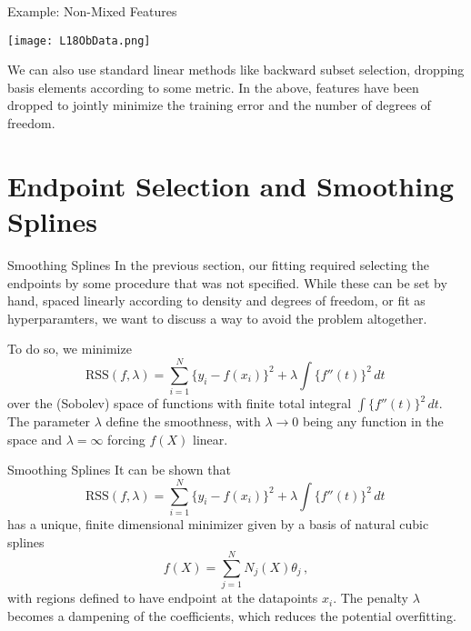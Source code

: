 \documentclass[10pt, table, dvipsnames,xcdraw,handout]{beamer}
\begin{document}
\begin{frame}[fragile]{Example: Non-Mixed Features}
  \begin{minipage}[t][0.5\textheight][t]{\textwidth}
	\centering \texttt{[image: L18ObData.png]} 
  \end{minipage}
  \vfill
\begin{minipage}[t][0.5\textheight][t]{\textwidth}
We can also use standard linear methods like backward subset selection, dropping basis elements according to some metric. In the above, features have been dropped to jointly minimize the training error and the number of degrees of freedom.
\end{minipage}
\end{frame}




\section{Endpoint Selection and Smoothing Splines}

\begin{frame}[fragile]{Smoothing Splines}
In the previous section, our fitting required selecting the endpoints by some procedure that was not specified. While these can be set by hand, spaced linearly according to density and degrees of freedom, or fit as hyperparamters, we want to discuss a way to avoid the problem altogether. \pause

To do so, we minimize
$$
\text{RSS}(f,\lambda) =\sum_{i=1}^N\{y_i - f(x_i)\}^2 + \lambda\int\{f''(t)\}^2\,dt\,
$$
over the (Sobolev) space of functions with finite total integral $\int\{f''(t)\}^2\,dt$. \pause  The parameter $\lambda$ define the smoothness, with $\lambda\to 0$ being any function in the space and $\lambda = \infty$ forcing $f(X)$ linear. 
\end{frame}


\begin{frame}[fragile]{Smoothing Splines}
It can be shown that 
$$
\text{RSS}(f,\lambda) =\sum_{i=1}^N\{y_i - f(x_i)\}^2 + \lambda\int\{f''(t)\}^2\,dt\,
$$
has a unique, finite dimensional minimizer given by a basis of natural cubic splines
$$
f(X) = \sum_{j=1}^N N_j(X)\theta_j\,,
$$\pause
with regions defined to have endpoint at the datapoints $x_i$. \pause The penalty $\lambda$ becomes a dampening of the coefficients, which reduces the potential overfitting.
\end{frame}
\end{document}
